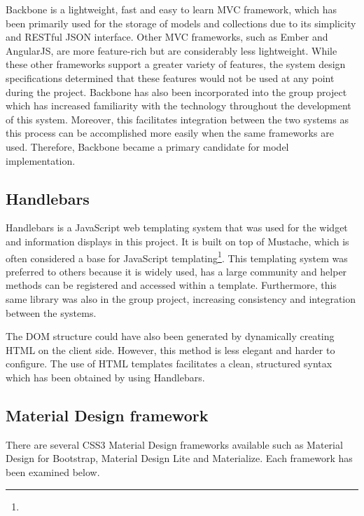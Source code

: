 {{		Backbone is a lightweight, fast and easy to learn MVC framework, which has been primarily used for the storage of models and collections due to its simplicity and RESTful JSON interface. Other MVC frameworks, such as Ember and AngularJS, are more feature-rich but are considerably less lightweight. While these other frameworks support a greater variety of features, the system design specifications determined that these features would not be used at any point during the project. Backbone has also been incorporated into the group project which has increased familiarity with the technology throughout the development of this system. Moreover, this facilitates integration between the two systems as this process can be accomplished more easily when the same frameworks are used. Therefore, Backbone became a primary candidate for model implementation.

	}

	\subsection{Handlebars} {
	\label{sec:handlebars}

		Handlebars is a JavaScript web templating system that was used for the widget and information displays in this project. It is built on top of Mustache, which is often considered a base for JavaScript templating\footnote{}. This templating system was preferred to others because it is widely used, has a large community and helper methods can be registered and accessed within a template. Furthermore, this same library was also in the group project, increasing consistency and integration between the systems.

		The DOM structure could have also been generated by dynamically creating HTML on the client side. However, this method is less elegant and harder to configure. The use of HTML templates facilitates a clean, structured syntax which has been obtained by using Handlebars.

	}

	\subsection{Material Design framework} {
	\label{sec:material_design_framework}

		There are several CSS3 Material Design frameworks available such as Material Design for Bootstrap, Material Design Lite and Materialize. Each framework has been examined below.

}}
